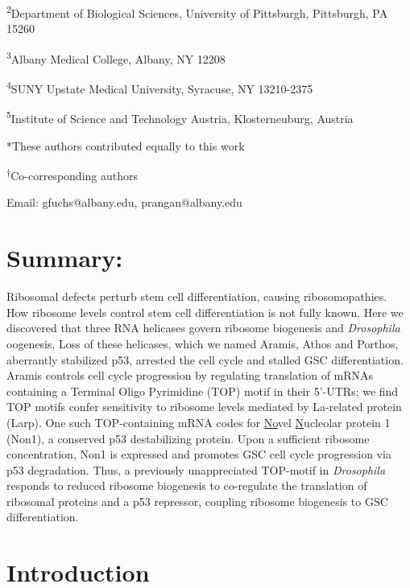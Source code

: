 \documentclass[12pt,oneside]{reedthesis}
\begin{document}
\textsuperscript{2}Department of Biological Sciences, University of Pittsburgh,
Pittsburgh, PA 15260

\textsuperscript{3}Albany Medical College, Albany, NY 12208

\textsuperscript{4}SUNY Upstate Medical University, Syracuse, NY 13210-2375

\textsuperscript{5}Institute of Science and Technology Austria, Klosterneuburg, Austria

*These authors contributed equally to this work

\textsuperscript{†}Co-corresponding authors

Email: gfuchs@albany.edu,
prangan@albany.edu

\hypertarget{summary-1}{%
\section{Summary:}\label{summary-1}}

Ribosomal defects perturb stem cell differentiation,
causing ribosomopathies. How ribosome levels control stem cell
differentiation is not fully known. Here we discovered that three RNA
helicases govern ribosome biogenesis and \emph{Drosophila} oogenesis. Loss of
these helicases, which we named Aramis, Athos and Porthos, aberrantly
stabilized p53, arrested the cell cycle and stalled GSC differentiation.
Aramis controls cell cycle progression by regulating translation of
mRNAs containing a Terminal Oligo Pyrimidine (TOP) motif in their
5'-UTRs; we find TOP motifs confer sensitivity to ribosome levels
mediated by La-related protein (Larp). One such TOP-containing mRNA
codes for \underline{No}vel \underline{N}ucleolar protein 1 (Non1), a conserved
p53 destabilizing protein. Upon a sufficient ribosome concentration,
Non1 is expressed and promotes GSC cell cycle progression via p53
degradation. Thus, a previously unappreciated TOP-motif in \emph{Drosophila}
responds to reduced ribosome biogenesis to co-regulate the translation
of ribosomal proteins and a p53 repressor, coupling ribosome biogenesis
to GSC differentiation.

\hypertarget{introduction-2}{%
\section{Introduction}\label{introduction-2}}
\end{document}
